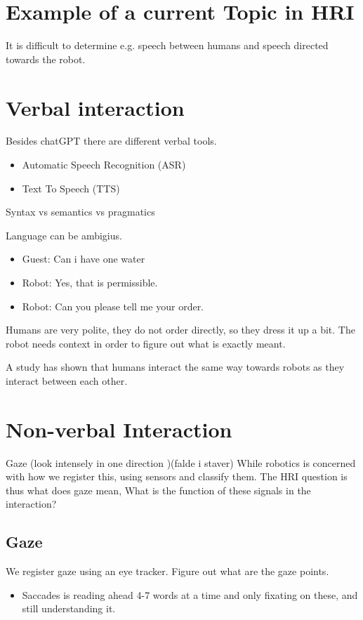 \documentclass[a4paper]{article}
\begin{document}
\section{Example of a current Topic in HRI}
It is difficult to determine e.g. speech between humans and speech directed towards the robot. 

\section{Verbal interaction}
Besides chatGPT there are different verbal tools.
\begin{itemize}
	\item Automatic Speech Recognition (ASR)
	\item Text To Speech (TTS)
\end{itemize}

Syntax vs semantics vs pragmatics


Language can be ambigius. 
\begin{itemize}
	\item Guest: Can i have one water
	\item Robot: Yes, that is permissible.
	\item Robot: Can you please tell me your order.
\end{itemize}

Humans are very polite, they do not order directly, so they dress it up a bit. The robot needs context in order to figure out what is exactly meant. 

A study has shown that humans interact the same way towards robots as they interact between each other. 

\section{Non-verbal Interaction}
Gaze (look intensely in one direction )(falde i staver)
While robotics is concerned with how we register this, using sensors and classify them. The HRI question is thus what does gaze mean, What is the function of these signals in the interaction?

\subsection{Gaze}
We register gaze using an eye tracker. Figure out what are the gaze points. 
\begin{itemize}
	\item Saccades is reading ahead 4-7 words at a time and only fixating on these, and still understanding it. 
\end{itemize}
\end{document}
